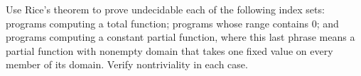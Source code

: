 \begin{exercise}
\label{ex:universal-reductions-01}
Use Rice's theorem to prove undecidable each of the following index sets:
programs computing a total function; programs whose range contains \(0\); and
programs computing a constant partial function, where this last phrase means a
partial function with nonempty domain that takes one fixed value on every
member of its domain.  Verify nontriviality in each case.
\end{exercise}

